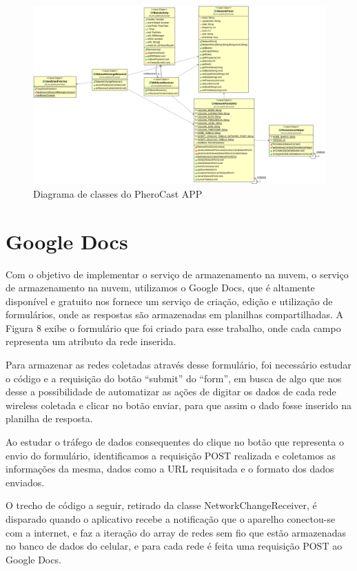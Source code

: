 \documentclass[12pt, %
openright, 
oneside,
a4paper,
brazil]{facom-ufu-abntex2}
\begin{document}
  \begin{figure}[hbt]
  \includegraphics [scale=.3] {diagrama}
  \caption{Diagrama de classes do PheroCast APP}
\end{figure}
  

 \section{Google Docs}
Com o objetivo de implementar o serviço de armazenamento na nuvem, o serviço de armazenamento na nuvem, utilizamos o Google Docs, que é altamente disponível e gratuito nos fornece um serviço de criação, edição e utilização de formulários, onde as respostas são armazenadas em planilhas compartilhadas. A Figura 8 exibe o formulário que foi criado para esse trabalho, onde cada campo representa um atributo da rede inserida.

Para armazenar as redes coletadas através desse formulário, foi necessário estudar o código e a requisição do botão ``submit'' do ``form'', em busca de algo que nos desse a possibilidade de automatizar as ações de digitar os dados de cada rede wireless coletada e clicar no botão enviar, para que assim o dado fosse inserido na planilha de resposta.

Ao estudar o tráfego de dados consequentes do clique no botão que representa o envio do formulário, identificamos a requisição POST realizada e coletamos as informações da mesma, dados como a URL requisitada e o formato dos dados enviados. 

O trecho de código a seguir, retirado da classe NetworkChangeReceiver, é disparado quando o aplicativo recebe a notificação que o aparelho conectou-se com a internet, e faz a iteração do array de redes sem fio que estão armazenadas no banco de dados do celular, e para cada rede é feita uma requisição POST ao Google Docs.
\end{document}
